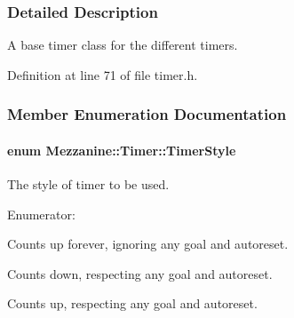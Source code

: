 \subsubsection{Detailed Description}
A base timer class for the different timers. 

Definition at line 71 of file timer.h.



\subsubsection{Member Enumeration Documentation}
\hypertarget{classMezzanine_1_1Timer_a1db436d4e0d6f1676e41ba3cb2ea3aaa}{
\paragraph[{TimerStyle}]{\setlength{\rightskip}{0pt plus 5cm}enum {\bf Mezzanine::Timer::TimerStyle}}\hfill}
\label{classMezzanine_1_1Timer_a1db436d4e0d6f1676e41ba3cb2ea3aaa}


The style of timer to be used. 

\begin{Desc}
\item[Enumerator: ]\par
\begin{description}
\item[{\em 
\hypertarget{classMezzanine_1_1Timer_a1db436d4e0d6f1676e41ba3cb2ea3aaaa023d2336d30bf4bcba70f2511af2c3c3}{
Normal}
\label{classMezzanine_1_1Timer_a1db436d4e0d6f1676e41ba3cb2ea3aaaa023d2336d30bf4bcba70f2511af2c3c3}
}]Counts up forever, ignoring any goal and autoreset. \item[{\em 
\hypertarget{classMezzanine_1_1Timer_a1db436d4e0d6f1676e41ba3cb2ea3aaaae421b07061ca1f45a2f1080316c3dbb7}{
StopWatch}
\label{classMezzanine_1_1Timer_a1db436d4e0d6f1676e41ba3cb2ea3aaaae421b07061ca1f45a2f1080316c3dbb7}
}]Counts down, respecting any goal and autoreset. \item[{\em 
\hypertarget{classMezzanine_1_1Timer_a1db436d4e0d6f1676e41ba3cb2ea3aaaad408501a2b2ad050dce4591e1735a6a2}{
Alarm}
\label{classMezzanine_1_1Timer_a1db436d4e0d6f1676e41ba3cb2ea3aaaad408501a2b2ad050dce4591e1735a6a2}
}]Counts up, respecting any goal and autoreset. \end{description}
\end{Desc}



